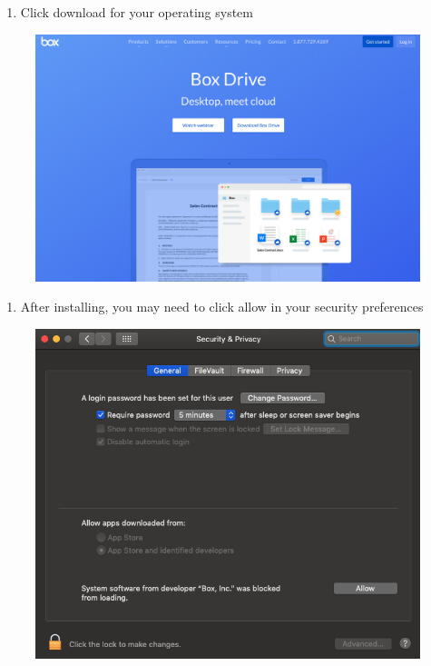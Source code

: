 \documentclass[]{book}
\providecommand{\tightlist}{%
  \setlength{\itemsep}{0pt}\setlength{\parskip}{0pt}}
\begin{document}
\begin{enumerate}
\def\labelenumi{\arabic{enumi}.}
\tightlist
\item
  Click download for your operating system
\end{enumerate}

\begin{figure}
\centering
\includegraphics{images/lab_protocols/box/1.png}
\caption{}
\end{figure}

\begin{enumerate}
\def\labelenumi{\arabic{enumi}.}
\setcounter{enumi}{1}
\tightlist
\item
  After installing, you may need to click allow in your security preferences
\end{enumerate}

\begin{figure}
\centering
\includegraphics{images/lab_protocols/box/2.png}
\caption{}
\end{figure}
\end{document}
